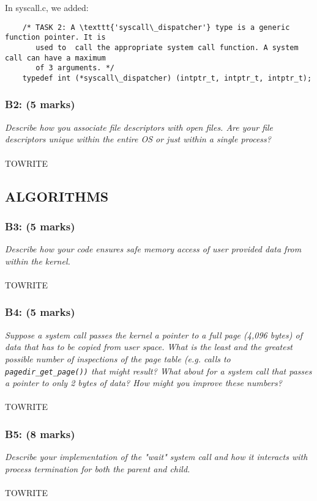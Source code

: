 \documentclass{article}
\begin{document}
In syscall.c, we added:
\begin{lstlisting}
    /* TASK 2: A \texttt{'syscall\_dispatcher'} type is a generic function pointer. It is
       used to  call the appropriate system call function. A system call can have a maximum
       of 3 arguments. */
    typedef int (*syscall\_dispatcher) (intptr_t, intptr_t, intptr_t);
\end{lstlisting}



\subsubsection*{B2: (5 marks) }
\textit{Describe how you associate file descriptors with open files. Are your
file descriptors unique within the entire OS or just within a single process? }
\\ \\ TOWRITE

\subsection{ALGORITHMS}

\subsubsection*{B3: (5 marks) }
\textit{Describe how your code ensures safe memory access of user provided data
from within the kernel. }
\\ \\TOWRITE

\subsubsection*{B4: (5 marks) }
\textit{Suppose a system call passes the kernel a pointer to a full page (4,096
bytes) of data that has to be copied from user space. What is the least and the
greatest possible number of inspections of the page table (e.g. calls to
\texttt{pagedir\_get\_page())} that might result? What about for a system
 call that passes a pointer to only 2 bytes of data? How might you improve these
numbers? }
\\ \\TOWRITE

\subsubsection*{B5: (8 marks) }
\textit{Describe your implementation of the "wait" system call and how it interacts
with process termination for both the parent and child.}
\\ \\ TOWRITE
\end{document}

